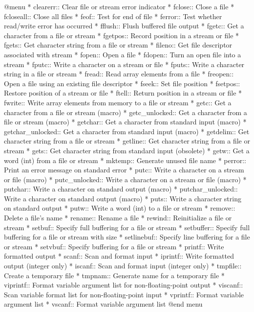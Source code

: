 @menu  
* clearerr::    Clear file or stream error indicator
* fclose::      Close a file
* fcloseall::   Close all files
* feof::        Test for end of file
* ferror::      Test whether read/write error has occurred
* fflush::      Flush buffered file output
* fgetc::       Get a character from a file or stream
* fgetpos::     Record position in a stream or file
* fgets::       Get character string from a file or stream
* fileno::      Get file descriptor associated with stream
* fopen::       Open a file
* fdopen::	Turn an open file into a stream
* fputc::       Write a character on a stream or file
* fputs::       Write a character string in a file or stream
* fread::       Read array elements from a file
* freopen::     Open a file using an existing file descriptor
* fseek::       Set file position
* fsetpos::     Restore position of a stream or file
* ftell::       Return position in a stream or file
* fwrite::      Write array elements from memory to a file or stream
* getc::        Get a character from a file or stream (macro)
* getc_unlocked::	Get a character from a file or stream (macro)
* getchar::     Get a character from standard input (macro)
* getchar_unlocked::	Get a character from standard input (macro)
* getdelim::    Get character string from a file or stream
* getline::     Get character string from a file or stream
* gets::        Get character string from standard input (obsolete)
* getw::        Get a word (int) from a file or stream
* mktemp::      Generate unused file name
* perror::      Print an error message on standard error
* putc::        Write a character on a stream or file (macro)
* putc_unlocked::	Write a character on a stream or file (macro)
* putchar::     Write a character on standard output (macro)
* putchar_unlocked::	Write a character on standard output (macro)
* puts::        Write a character string on standard output
* putw::        Write a word (int) to a file or stream
* remove::      Delete a file's name
* rename::      Rename a file
* rewind::      Reinitialize a file or stream
* setbuf::      Specify full buffering for a file or stream
* setbuffer::   Specify full buffering for a file or stream with size
* setlinebuf::  Specify line buffering for a file or stream
* setvbuf::     Specify buffering for a file or stream
* printf::      Write formatted output
* scanf::       Scan and format input
* iprintf::     Write formatted output (integer only)
* iscanf::      Scan and format input (integer only)
* tmpfile::     Create a temporary file
* tmpnam::      Generate name for a temporary file
* viprintf::    Format variable argument list for non-floating-point output
* viscanf::     Scan variable format list for non-floating-point input
* vprintf::     Format variable argument list
* vscanf::      Format variable argument list
@end menu 

